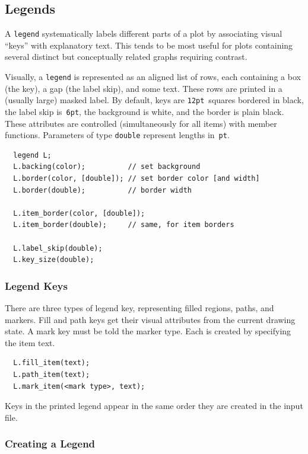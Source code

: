 \documentclass[12pt,letterpaper]{book}
\newcommand{\code}[1]{\texttt{#1}}
\newcommand{\findex}[1]{\ignorespaces}
\begin{document}
\subsection{Legends}

A \code{legend} systematically labels different parts of a plot by
associating visual ``keys'' with explanatory text. This tends to be
most useful for plots containing several distinct but conceptually
related graphs requiring contrast. 

Visually, a \code{legend} is represented as an aligned list of rows,
each containing a box (the key), a gap (the label skip), and some
text.  These rows are printed in a (usually large) masked label. By
default, keys are \code{12pt}~squares bordered in black, the label
skip is~\code{6pt}, the background is white, and the border is plain
black. These attributes are controlled (simultaneously for all items)
with member functions.  Parameters of type \code{double} represent
lengths in~\code{pt}.
\findex{legend}
\findex{legend.backing}
\findex{legend.border}
\findex{legend.item\_border}
\findex{legend.label\_skip}
\findex{legend.key\_size}
\begin{verbatim}
  legend L;
  L.backing(color);          // set background
  L.border(color, [double]); // set border color [and width]
  L.border(double);          // border width

  L.item_border(color, [double]);
  L.item_border(double);     // same, for item borders

  L.label_skip(double);
  L.key_size(double);
\end{verbatim}


\subsubsection*{Legend Keys}

There are three types of legend key, representing filled regions,
paths, and markers. Fill and path keys get their visual attributes
from the current drawing state. A mark key must be told the marker
type. Each is created by specifying the item text.
\findex{legend.fill\_item}
\findex{legend.path\_item}
\findex{legend.mark\_item}
\begin{verbatim}
  L.fill_item(text);
  L.path_item(text);
  L.mark_item(<mark type>, text);
\end{verbatim}
Keys in the printed legend appear in the same order they are created
in the input file.


\subsubsection*{Creating a Legend}
\end{document}
